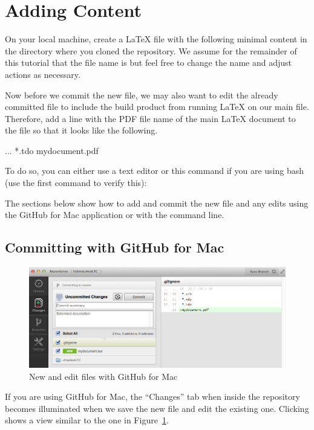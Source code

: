 
\section{Adding Content}

On your local machine, create a LaTeX file with the following minimal content in the directory where you cloned the repository.  We assume for the remainder of this tutorial that the file name is  but feel free to change the name and adjust actions as necessary.

Now before we commit the new file, we may also want to edit the already committed  file to include the build product from running LaTeX on our main file.  Therefore, add a line with the PDF file name of the main LaTeX document to the file  so that it looks like the following.
\begin{FileVerbatim}
...
*.tdo
mydocument.pdf
\end{FileVerbatim}

To do so, you can either use a text editor or this command if you are using bash (use the first command to verify this):

The sections below show how to add and commit the new file and any edits using the GitHub for Mac application or with the command line.

\subsection{Committing with GitHub for Mac}

\begin{figure}
\centering
\includegraphics[scale=\myscale]{figures/github-mac-new-file}
\caption{New and edit files with GitHub for Mac} \label{fig:github-mac-new-file}
\end{figure}
If you are using GitHub for Mac, the ``Changes'' tab when inside the repository becomes illuminated when we save the new file and edit the existing one.  Clicking shows a view similar to the one in Figure~\ref{fig:github-mac-new-file}.  

